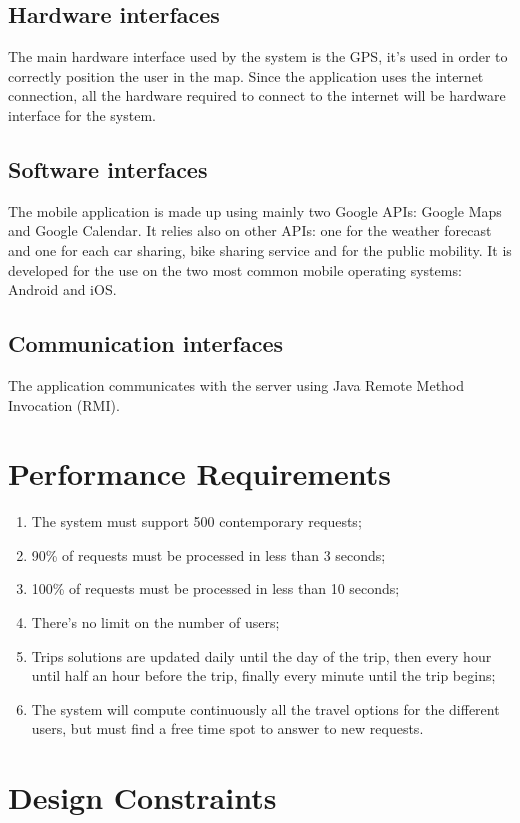 \subsection{Hardware interfaces}
The main hardware interface used by the system is the GPS, it's used in order to correctly position the user in the map. Since the application uses the internet connection, all the hardware required to connect to the internet will be hardware interface for the system.
%
\subsection{Software interfaces}
The mobile application is made up using mainly two Google APIs: Google Maps and Google Calendar. It relies also on other APIs: one for the weather forecast and one for each car sharing, bike sharing service and for the public mobility.
It is developed for the use on the two most common mobile operating systems: Android and iOS.
%
\subsection{Communication interfaces}
The application communicates with the server using Java Remote Method Invocation (RMI).
%
%
\section{Performance Requirements}
\begin{enumerate}
\item The system must support 500 contemporary requests;
\item 90\% of requests must be processed in less than 3 seconds;
\item 100\% of requests must be processed in less than 10 seconds;
\item There’s no limit on the number of users;
\item Trips solutions are updated daily until the day of the trip, then every hour until half an hour before the trip, finally every minute until the trip begins;
\item The system will compute continuously all the travel options for the different users, but must find a free time spot to answer to new requests.
\end{enumerate}
%
%
\section{Design Constraints}
%

